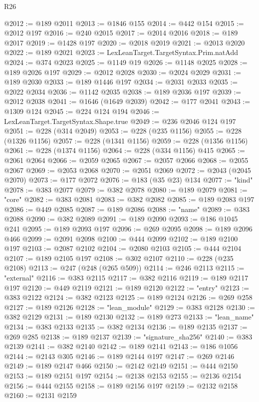 \begin{lexlean}{R26}
\begin{coremodule}
@2012 := @189 @2011
@2013 := @1846 @155
@2014 := @442 @154
@2015 := @2012 @197
@2016 := @240 @2015
@2017 := @2014 @2016
@2018 := @189 @2017
@2019 := @1428 @197
@2020 := @2018 @2019
@2021 := @2013 @2020
@2022 := @189 @2021
@2023 := LexLeanTarget.TargetSyntax.Prim.natAdd
@2024 := @374 @2023
@2025 := @1149 @19
@2026 := @1148 @2025
@2028 := @189 @2026 @197
@2029 := @2012 @2028
@2030 := @2024 @2029
@2031 := @189 @2030
@2033 := @189 @1446 @197
@2034 := @2031 @2033
@2035 := @2022 @2034
@2036 := @1142 @2035
@2038 := @189 @2036 @197
@2039 := @2012 @2038
@2041 := @1646 (@1649 @2039)
@2042 := @177 @2041
@2043 := @1309 @124
@2045 := @224 @124 @194
@2046 := LexLeanTarget.TargetSyntax.Shape.true
@2049 := @236 @2046 @124 @197
@2051 := @228 (@314 @2049)
@2053 := @228 (@235 @1156)
@2055 := @228 (@1326 @1156)
@2057 := @228 (@1341 @1156)
@2059 := @228 (@1356 @1156)
@2061 := @228 (@1374 @1156)
@2064 := @228 (@334 @1156) @415
@2065 := @2061 @2064
@2066 := @2059 @2065
@2067 := @2057 @2066
@2068 := @2055 @2067
@2069 := @2053 @2068
@2070 := @2051 @2069
@2072 := @2043 (@2045 @2070)
@2073 := @177 @2072
@2076 := @183 (@35 @23) @134
@2077 := "kind"
@2078 := @383 @2077
@2079 := @382 @2078
@2080 := @189 @2079
@2081 := "core"
@2082 := @383 @2081
@2083 := @382 @2082
@2085 := @189 @2083 @197
@2086 := @449 @2085
@2087 := @189 @2086
@2088 := "name"
@2089 := @383 @2088
@2090 := @382 @2089
@2091 := @189 @2090
@2093 := @186 @1045 @241
@2095 := @189 @2093 @197
@2096 := @269 @2095
@2098 := @189 @2096 @466
@2099 := @2091 @2098
@2100 := @444 @2099
@2102 := @189 @2100 @197
@2103 := @2087 @2102
@2104 := @2080 @2103
@2105 := @444 @2104
@2107 := @189 @2105 @197
@2108 := @302 @2107
@2110 := @228 (@235 @2108)
@2113 := @247 (@248 (@265 @509))
@2114 := @246 @2113
@2115 := "external"
@2116 := @383 @2115
@2117 := @382 @2116
@2119 := @189 @2117 @197
@2120 := @449 @2119
@2121 := @189 @2120
@2122 := "entry"
@2123 := @383 @2122
@2124 := @382 @2123
@2125 := @189 @2124
@2126 := @269 @258
@2127 := @189 @2126
@2128 := "lean_module"
@2129 := @383 @2128
@2130 := @382 @2129
@2131 := @189 @2130
@2132 := @189 @273
@2133 := "lean_name"
@2134 := @383 @2133
@2135 := @382 @2134
@2136 := @189 @2135
@2137 := @269 @285
@2138 := @189 @2137
@2139 := "signature_sha256"
@2140 := @383 @2139
@2141 := @382 @2140
@2142 := @189 @2141
@2143 := @186 @1056
@2144 := @2143 @305
@2146 := @189 @2144 @197
@2147 := @269 @2146
@2149 := @189 @2147 @466
@2150 := @2142 @2149
@2151 := @444 @2150
@2153 := @189 @2151 @197
@2154 := @2138 @2153
@2155 := @2136 @2154
@2156 := @444 @2155
@2158 := @189 @2156 @197
@2159 := @2132 @2158
@2160 := @2131 @2159

\end{coremodule}
\end{lexlean}
